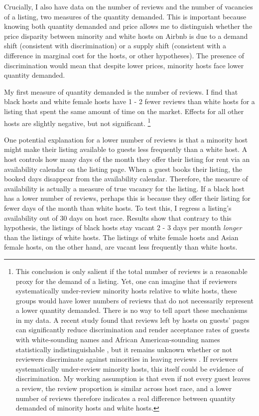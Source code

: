 Crucially, I also have data on the number of reviews and the number of vacancies of a listing, two measures of the quantity demanded. This is important because knowing both quantity demanded and price allows me to distinguish whether the price disparity between minority and white hosts on Airbnb is due to a demand shift (consistent with discrimination) or a supply shift (consistent with a difference in marginal cost for the hosts, or other hypotheses). The presence of discrimination would mean that despite lower prices, minority hosts face lower quantity demanded. 

My first measure of quantity demanded is the number of reviews. I find that black hosts and white female hosts have 1 - 2 fewer reviews than white hosts for a listing that spent the same amount of time on the market. Effects for all other hosts are slightly negative, but not significant.%
	\footnote{This conclusion is only salient if the total number of reviews is a reasonable proxy for the demand of a listing. Yet, one can imagine that if reviewers systematically under-review minority hosts relative to white hosts, these groups would have lower numbers of reviews that do not necessarily represent a lower quantity demanded. There is no way to tell apart these mechanisms in my data. A recent study found that reviews left by hosts on guests’ pages can significantly reduce discrimination and render acceptance rates of guests with white-sounding names and African American-sounding names statistically indistinguishable \citep{cui}, but it remains unknown whether or not reviewers discriminate against minorities in leaving reviews \citep{ye}. If reviewers systematically under-review minority hosts, this itself could be evidence of discrimination. My working assumption is that even if not every guest leaves a review, the review proportion is similar across host race, and a lower number of reviews therefore indicates a real difference between quantity demanded of minority hosts and white hosts.}

One potential explanation for a lower number of reviews is that a minority host might make their listing available to guests less frequently than a white host. A host controls how many days of the month they offer their listing for rent via an availability calendar on the listing page. When a guest books their listing, the booked days disappear from the availability calendar. Therefore, the measure of availability is actually a measure of true vacancy for the listing. If a black host has a lower number of reviews, perhaps this is because they offer their listing for fewer days of the month than white hosts. To test this, I regress a listing's availability out of 30 days on host race. Results show that contrary to this hypothesis, the listings of black hosts stay vacant 2 - 3 days per month \textit{longer} than the listings of white hosts. The listings of white female hosts and Asian female hosts, on the other hand, are vacant less frequently than white hosts.

